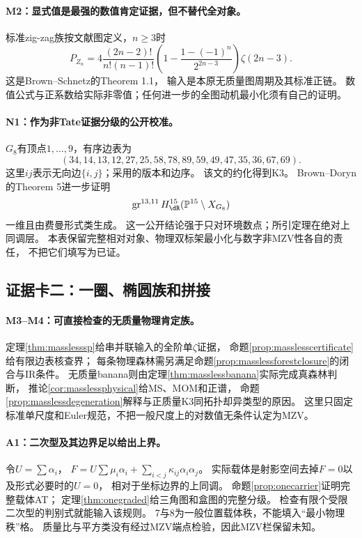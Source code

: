 \documentclass[11pt,a4paper]{ctexart}
\theoremstyle{cnplain}\newtheorem{theorem}{定理}[section]
\theoremstyle{definition}\newtheorem{definition}[theorem]{定义}
\theoremstyle{remark}\newtheorem{remark}[theorem]{注}
\begin{document}
\paragraph{M2：显式值是最强的数值肯定证据，但不替代全对象。}
标准zig-zag族按文献图定义，$n\ge3$时
\[
 P_{Z_n}=4\frac{(2n-2)!}{n!(n-1)!}
 \left(1-\frac{1-(-1)^n}{2^{2n-3}}\right)\zeta(2n-3).
\]
这是Brown--Schnetz的Theorem 1.1\cite{ClassZigzag}，
输入是本原无质量图周期及其标准正链。
数值公式与正系数给实际非零值；任何进一步的全图动机最小化须有自己的证明。

\paragraph{N1：作为非Tate证据分级的公开校准。}
$G_8$有顶点$1,\ldots,9$，有序边表为
\[
 (34,14,13,12,27,25,58,78,89,59,49,47,35,36,67,69).
\]
这里$ij$表示无向边$\{i,j\}$；采用\cite[\S6.2,式(30)]{ClassKthree}的版本和边序。
该文的约化得到K3。
Brown--Doryn的Theorem 5进一步证明
\[
 \operatorname{gr}^{13,11}H^{15}_{\dR}(\mathbb P^{15}\setminus X_{G_8})
\]
一维且由费曼形式类生成\cite{ClassFraming}。
这一公开结论强于只对环境数点；所引定理在绝对上同调层。
本表保留完整相对对象、物理双标架最小化与数字非MZV性各自的责任，
不把它们填写为已证。

\subsection{证据卡二：一圈、椭圆族和拼接}
\paragraph{M3--M4：可直接检查的无质量物理肯定族。}
定理\ref{thm:masslesssp}给串并联输入的全阶单$\zeta$证据，
命题\ref{prop:masslesscertificate}给有限边表核查界；
每条物理森林需另满足命题\ref{prop:masslessforestclosure}的闭合与IR条件。
无质量banana则由定理\ref{thm:masslessbanana}实际完成真森林判断，
推论\ref{cor:masslessphysical}给MS、MOM和正谱，
命题\ref{prop:masslessdegeneration}解释与正质量K3同拓扑却异类型的原因。
这里只固定标准单尺度和Euler规范，不把一般尺度上的对数值无条件认定为MZV。

\label{subsec:classelliptic}
\paragraph{A1：二次型及其边界足以给出上界。}
令$U=\sum\alpha_i$，
$F=U\sum\mu_i\alpha_i+\sum_{i<j}\kappa_{ij}\alpha_i\alpha_j$。
实际载体是射影空间去掉$F=0$以及形式必要时的$U=0$，
相对于坐标边界的上同调。
命题\ref{prop:onecarrier}证明完整载体AT；
定理\ref{thm:onegraded}给三角图和盒图的完整分级。
检查有限个受限二次型的判别式就能输入该规则。
7与8为一般位置载体秩，不能填入“最小物理秩”格。
质量比与平方类没有经过MZV端点检验，因此MZV栏保留未知。
\end{document}
